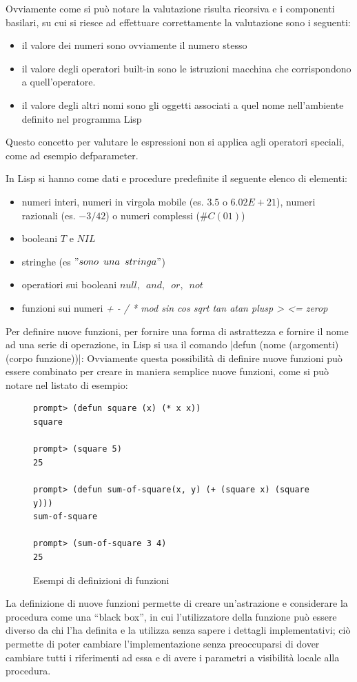 \documentclass[a4paper]{book}
\begin{document}
Ovviamente come si può notare la valutazione risulta ricorsiva e i componenti basilari, su cui si riesce ad effettuare correttamente la valutazione
sono i seguenti:
\begin{itemize}
\item il valore dei numeri sono ovviamente il numero stesso
\item il valore degli operatori built-in sono le istruzioni macchina che corrispondono a quell'operatore.
\item il valore degli altri nomi sono gli oggetti associati a quel nome nell'ambiente definito nel programma Lisp
\end{itemize}
Questo concetto per valutare le espressioni non si applica agli operatori speciali, come ad esempio defparameter.

In Lisp si hanno come dati e procedure predefinite il seguente elenco di elementi:
\begin{itemize}
\item numeri interi, numeri in virgola mobile (es. $3.5$ o $6.02E+21$), numeri razionali
      (es. $-3/42$) o numeri complessi ($\#C (0 1)$)
\item booleani $T$ e $NIL$
\item stringhe (es $"sono\,\,\, una \,\,\,stringa"$)
\item operatiori sui booleani $null,\,\,\,and,\,\,\, or,\,\,\,not$
\item funzioni sui numeri \textit{+ - / * mod sin cos sqrt tan atan plusp > <= zerop}
\end{itemize}
Per definire nuove funzioni, per fornire una forma di astrattezza e fornire il nome ad una serie di operazione,
in Lisp si usa il comando |defun (nome (argomenti) (corpo funzione))|:
Ovviamente questa possibilità di definire nuove funzioni può essere combinato per creare
in maniera semplice nuove funzioni, come si può notare nel listato di esempio:
\begin{figure}
\caption{Esempi di definizioni di funzioni}
\begin{verbatim}
prompt> (defun square (x) (* x x))
square

prompt> (square 5)
25

prompt> (defun sum-of-square(x, y) (+ (square x) (square y)))
sum-of-square

prompt> (sum-of-square 3 4)
25
\end{verbatim}
\end{figure}
La definizione di nuove funzioni permette di creare un'astrazione e considerare la procedura come una ``black box'', in cui l'utilizzatore
della funzione può essere diverso da chi l'ha definita e la utilizza senza sapere i dettagli implementativi; ciò permette di poter cambiare
l'implementazione senza preoccuparsi di dover cambiare tutti i riferimenti ad essa e di avere i parametri a visibilità locale alla procedura.
\end{document}
